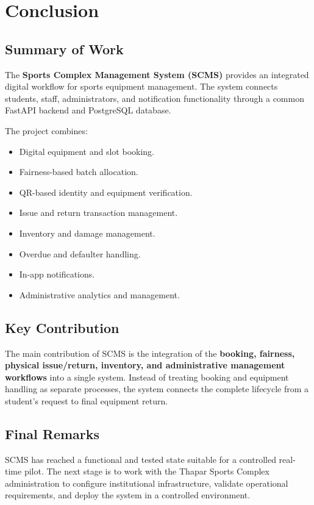 \documentclass[12pt,a4paper,oneside]{report}
\begin{document}
\chapter{Conclusion}

\section{Summary of Work}

The \textbf{Sports Complex Management System (SCMS)} provides an integrated digital workflow for sports equipment management. The system connects students, staff, administrators, and notification functionality through a common FastAPI backend and PostgreSQL database.

The project combines:

\begin{itemize}
    \item Digital equipment and slot booking.
    \item Fairness-based batch allocation.
    \item QR-based identity and equipment verification.
    \item Issue and return transaction management.
    \item Inventory and damage management.
    \item Overdue and defaulter handling.
    \item In-app notifications.
    \item Administrative analytics and management.
\end{itemize}

\section{Key Contribution}

The main contribution of SCMS is the integration of the \textbf{booking, fairness, physical issue/return, inventory, and administrative management workflows} into a single system. Instead of treating booking and equipment handling as separate processes, the system connects the complete lifecycle from a student's request to final equipment return.

\section{Final Remarks}

SCMS has reached a functional and tested state suitable for a controlled real-time pilot. The next stage is to work with the Thapar Sports Complex administration to configure institutional infrastructure, validate operational requirements, and deploy the system in a controlled environment.
\end{document}
